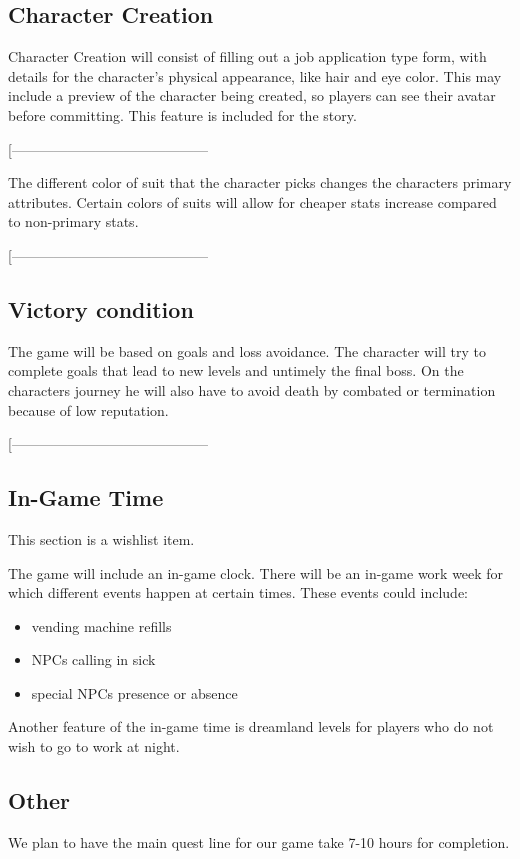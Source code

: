 \documentclass[9pt]{article}
\begin{document}
\subsection*{Character Creation}
Character Creation will consist of filling out a job application type form, 
with details for the character's physical appearance, like hair and eye color. 
This may include a preview of the character being created, so players can see
their avatar before committing. This feature is included for the story. 


\smallskip
[------------------------------------------
\smallskip

The different color of suit that the character picks changes the characters primary attributes. Certain colors of suits will allow for cheaper stats increase compared to non-primary stats.

\smallskip
[------------------------------------------
















\subsection*{Victory condition}


The game will be based on goals and loss avoidance. The character will try to complete goals that lead to new levels and untimely the final boss. On the characters journey he will also have to avoid death by combated or termination because of low reputation.

\smallskip
[------------------------------------------
















\subsection*{In-Game Time}
This section is a wishlist item. 

The game will include an in-game clock. There will be an in-game work week
for which different events happen at certain times. These events could include:
\begin{itemize}
\item vending machine refills
\item NPCs calling in sick 
\item special NPCs presence or absence
\end{itemize}

Another feature of the in-game time is dreamland levels for players who
do not wish to go to work at night. 

\subsection*{Other}
We plan to have the main quest line for our game take 7-10 hours for completion.
\end{document}
